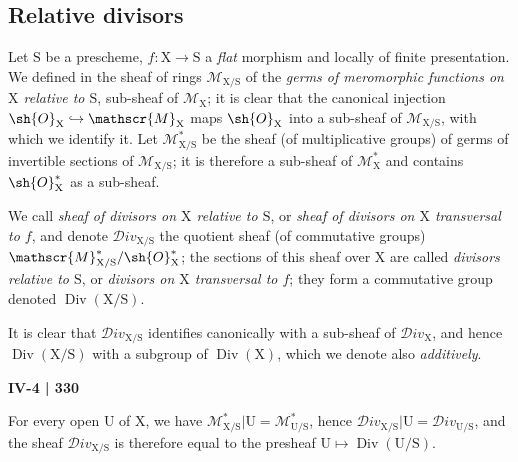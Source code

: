 \begin{env}[21.14.4bis]
\end{env}

\subsection{Relative divisors}
\label{subsection:IV.21.15}

\begin{env}[21.15.1]
\label{IV.21.15.1}
Let $\mathrm{S}$ be a prescheme, $f:\mathrm{X}\to\mathrm{S}$ a \emph{flat} morphism and locally of finite presentation.
We defined in  the sheaf of rings $\mathscr{M}_{\mathrm{X}/\mathrm{S}}$ of the \emph{germs of meromorphic functions on $\mathrm{X}$ relative to $\mathrm{S}$}, sub-sheaf of $\mathscr{M}_{\mathrm{X}}$; it is clear that the canonical injection $\sh{O}_{\mathrm{X}}\hookrightarrow\mathscr{M}_{\mathrm{X}}$  maps $\sh{O}_{\mathrm{X}}$ into a sub-sheaf of $\mathscr{M}_{\mathrm{X}/\mathrm{S}}$, with which we identify it.
Let $\mathscr{M}_{\mathrm{X}/\mathrm{S}}^*$ be the sheaf (of multiplicative groups) of germs of invertible sections of $\mathscr{M}_{\mathrm{X}/\mathrm{S}}$; it is therefore a sub-sheaf of $\mathscr{M}_{\mathrm{X}}^*$ and contains $\sh{O}_{\mathrm{X}}^*$ as a sub-sheaf.
\end{env}

\begin{definition}[21.15.2]
\label{IV.21.15.2}
We call \emph{sheaf of divisors on $\mathrm{X}$ relative to $\mathrm{S}$}, or \emph{sheaf of divisors on $\mathrm{X}$ transversal to $f$}, and denote $\mathscr{D}iv_{\mathrm{X}/\mathrm{S}}$ the quotient sheaf (of commutative groups) $\mathscr{M}_{\mathrm{X}/\mathrm{S}}^*/\sh{O}_{\mathrm{X}}^*$; the sections of this sheaf over $\mathrm{X}$ are called \emph{divisors relative to $\mathrm{S}$}, or \emph{divisors on $\mathrm{X}$ transversal to $f$}; they form a commutative group denoted $\operatorname{Div}(\mathrm{X}/\mathrm{S})$.
\end{definition}

It is clear that $\mathscr{D}iv_{\mathrm{X}/\mathrm{S}}$ identifies canonically with a sub-sheaf of $\mathscr{D}iv_{\mathrm{X}}$, and hence $\operatorname{Div}(\mathrm{X}/\mathrm{S})$ with a subgroup of $\operatorname{Div}(\mathrm{X})$, which we denote also \emph{additively}.

\par\noindent\hfill{\footnotesize\textbf{IV-4 | 330}}\par
For every open $\mathrm{U}$ of $\mathrm{X}$, we have $\mathscr{M}_{\mathrm{X}/\mathrm{S}}^*|\mathrm{U}=\mathscr{M}_{\mathrm{U}/\mathrm{S}}^*$, hence $\mathscr{D}iv_{\mathrm{X}/\mathrm{S}}|\mathrm{U}=\mathscr{D}iv_{\mathrm{U}/\mathrm{S}}$, and the sheaf $\mathscr{D}iv_{\mathrm{X}/\mathrm{S}}$ is therefore equal to the presheaf $\mathrm{U}\mapsto\operatorname{Div}(\mathrm{U}/\mathrm{S})$.

